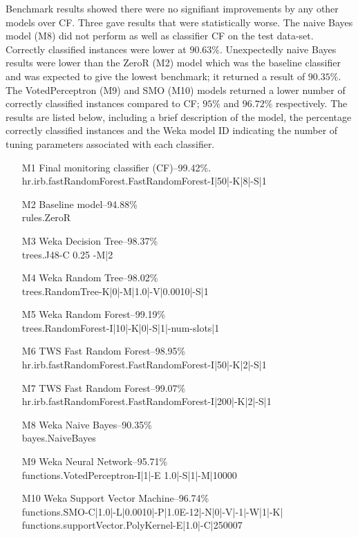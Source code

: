 Benchmark results showed there were no signifiant improvements by any other models over CF. Three gave results that were statistically worse. The naive Bayes model (M8) did not perform as well as classifier CF on the test data-set. Correctly classified instances were lower at $90.63\%$. Unexpectedly naive Bayes results were lower than the ZeroR (M2) model which was the baseline classifier and was expected to give the lowest benchmark; it returned a result of $90.35\%$. The VotedPerceptron (M9) and SMO (M10) models returned a lower number of correctly classified instances compared to CF; $95\% $ and $96.72\%$ respectively. The results are listed below, including a brief description of the model, the percentage correctly classified instances and the Weka model ID indicating the number of tuning parameters associated with each classifier.

\begin{enumerate}
\item [M1] Final monitoring classifier (CF)--99.42\%.\\hr.irb.fastRandomForest.FastRandomForest-I|50|-K|8|-S|1
\item [M2] Baseline model--94.88\%\textasteriskcentered \\rules.ZeroR 
\item [M3] Weka Decision Tree--98.37\%\\trees.J48-C 0.25 -M|2 
\item [M4] Weka Random Tree--98.02\% \\trees.RandomTree-K|0|-M|1.0|-V|0.0010|-S|1 
\item [M5] Weka Random Forest--99.19\% \\trees.RandomForest-I|10|-K|0|-S|1|-num-slots|1 
\item [M6] \ac{TWS} Fast Random Forest--98.95\% \\ hr.irb.fastRandomForest.FastRandomForest-I|50|-K|2|-S|1 
\item [M7] \ac{TWS} Fast Random Forest--99.07\% \\hr.irb.fastRandomForest.FastRandomForest-I|200|-K|2|-S|1
\item [M8] Weka Naive Bayes--90.35\%\textasteriskcentered \\bayes.NaiveBayes 
\item [M9] Weka Neural Network--95.71\%\textasteriskcentered \\functions.VotedPerceptron-I|1|-E 1.0|-S|1|-M|10000
\item [M10] Weka Support Vector Machine--96.74\%\textasteriskcentered \\functions.SMO-C|1.0|-L|0.0010|-P|1.0E-12|-N|0|-V|-1|-W|1|-K|\\
functions.supportVector.PolyKernel-E|1.0|-C|250007 
\end{enumerate}

